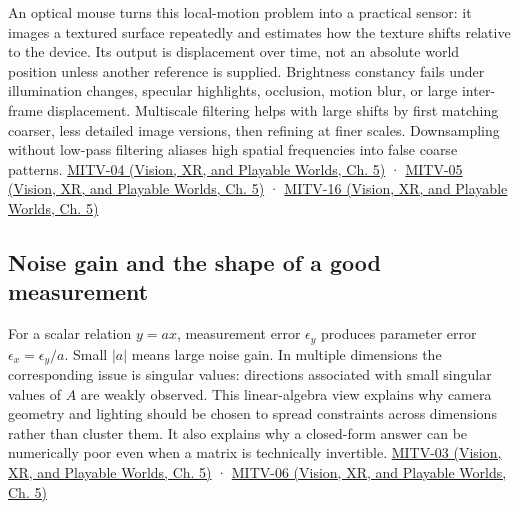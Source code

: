 An optical mouse turns this local-motion problem into a practical sensor: it images a textured surface repeatedly and estimates how the texture shifts relative to the device. Its output is displacement over time, not an absolute world position unless another reference is supplied. Brightness constancy fails under illumination changes, specular highlights, occlusion, motion blur, or large inter-frame displacement. Multiscale filtering helps with large shifts by first matching coarser, less detailed image versions, then refining at finer scales. Downsampling without low-pass filtering aliases high spatial frequencies into false coarse patterns. \href{../07-Vision-XR-and-Playable-Worlds/main.pdf\#nameddest=04-visual-computing-ii-ch036-mitv-04---fixed-optical-flow-optical-mouse-constant-brightness-assumption-closed-form-solution}{MITV-04 (Vision, XR, and Playable Worlds, Ch. 5)} · \href{../07-Vision-XR-and-Playable-Worlds/main.pdf\#nameddest=04-visual-computing-ii-ch036-mitv-05---tcc-and-for-montivision-demos-vanishing-point-use-of-vps-in-camera-calibration}{MITV-05 (Vision, XR, and Playable Worlds, Ch. 5)} · \href{../07-Vision-XR-and-Playable-Worlds/main.pdf\#nameddest=04-visual-computing-ii-ch036-mitv-16---fast-convolution-low-pass-filter-approximations-integral-images-us-6457032}{MITV-16 (Vision, XR, and Playable Worlds, Ch. 5)}

\subsection{Noise gain and the shape of a good measurement}\label{04-visual-computing-ii-ch030-noise-gain-and-the-shape-of-a-good-measurement}

\hypertarget{04-visual-computing-ii-ch030-noise-gain-and-the-shape-of-a-good-measurement}{}

For a scalar relation \(y=ax\), measurement error \(\epsilon_y\) produces parameter error \(\epsilon_x=\epsilon_y/a\). Small \(|a|\) means large noise gain. In multiple dimensions the corresponding issue is singular values: directions associated with small singular values of \(A\) are weakly observed. This linear-algebra view explains why camera geometry and lighting should be chosen to spread constraints across dimensions rather than cluster them. It also explains why a closed-form answer can be numerically poor even when a matrix is technically invertible. \href{../07-Vision-XR-and-Playable-Worlds/main.pdf\#nameddest=04-visual-computing-ii-ch036-mitv-03---time-to-contact-focus-of-expansion-direct-motion-vision-methods-noise-gain}{MITV-03 (Vision, XR, and Playable Worlds, Ch. 5)} · \href{../07-Vision-XR-and-Playable-Worlds/main.pdf\#nameddest=04-visual-computing-ii-ch036-mitv-06---photometric-stereo-noise-gain-error-amplification-eigenvalues-and-eigenvectors-review}{MITV-06 (Vision, XR, and Playable Worlds, Ch. 5)}

